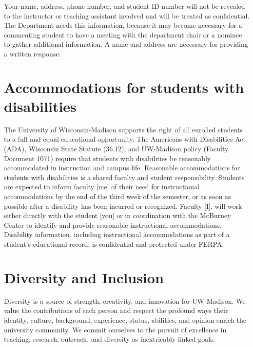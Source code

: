 \documentclass[
]{book}
\begin{document}
Your name, address, phone number, and student ID number will not be revealed to the instructor or teaching assistant involved and will be treated as confidential. The Department needs this information, because it may become necessary for a commenting student to have a meeting with the department chair or a nominee to gather additional information. A name and address are necessary for providing a written response.

\hypertarget{accommodations-for-students-with-disabilities}{%
\section{Accommodations for students with disabilities}\label{accommodations-for-students-with-disabilities}}

The University of Wisconsin-Madison supports the right of all enrolled students to a full and equal educational opportunity. The Americans with Disabilities Act (ADA), Wisconsin State Statute (36.12), and UW-Madison policy (Faculty Document 1071) require that students with disabilities be reasonably accommodated in instruction and campus life. Reasonable accommodations for students with disabilities is a shared faculty and student responsibility. Students are expected to inform faculty {[}me{]} of their need for instructional accommodations by the end of the third week of the semester, or as soon as possible after a disability has been incurred or recognized. Faculty {[}I{]}, will work either directly with the student {[}you{]} or in coordination with the McBurney Center to identify and provide reasonable instructional accommodations. Disability information, including instructional accommodations as part of a student's educational record, is confidential and protected under FERPA.

\hypertarget{diversity-and-inclusion}{%
\section{Diversity and Inclusion}\label{diversity-and-inclusion}}

Diversity is a source of strength, creativity, and innovation for UW-Madison. We value the contributions of each person and respect the profound ways their identity, culture, background, experience, status, abilities, and opinion enrich the university community. We commit ourselves to the pursuit of excellence in teaching, research, outreach, and diversity as inextricably linked goals.
\end{document}
